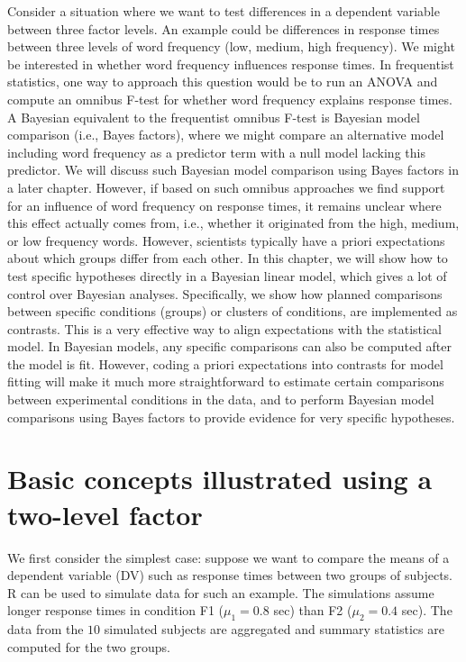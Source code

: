 \documentclass[12pt,]{krantz}
\theoremstyle{definition}
\theoremstyle{definition}
\theoremstyle{definition}
\theoremstyle{remark}
\begin{document}
Consider a situation where we want to test differences in a dependent
variable between three factor levels. An example could be differences in
response times between three levels of word frequency (low, medium, high
frequency). We might be interested in whether word frequency influences
response times. In frequentist statistics, one way to approach this
question would be to run an ANOVA and compute an omnibus F-test for
whether word frequency explains response times. A Bayesian equivalent to
the frequentist omnibus F-test is Bayesian model comparison (i.e., Bayes
factors), where we might compare an alternative model including word
frequency as a predictor term with a null model lacking this predictor.
We will discuss such Bayesian model comparison using Bayes factors in a
later chapter. However, if based on such omnibus approaches we find
support for an influence of word frequency on response times, it remains
unclear where this effect actually comes from, i.e., whether it
originated from the high, medium, or low frequency words. However,
scientists typically have a priori expectations about which groups
differ from each other. In this chapter, we will show how to test
specific hypotheses directly in a Bayesian linear model, which gives a
lot of control over Bayesian analyses. Specifically, we show how planned
comparisons between specific conditions (groups) or clusters of
conditions, are implemented as contrasts. This is a very effective way
to align expectations with the statistical model. In Bayesian models,
any specific comparisons can also be computed after the model is fit.
However, coding a priori expectations into contrasts for model fitting
will make it much more straightforward to estimate certain comparisons
between experimental conditions in the data, and to perform Bayesian
model comparisons using Bayes factors to provide evidence for very
specific hypotheses.

\section{Basic concepts illustrated using a two-level
factor}\label{basic-concepts-illustrated-using-a-two-level-factor}

We first consider the simplest case: suppose we want to compare the
means of a dependent variable (DV) such as response times between two
groups of subjects. R can be used to simulate data for such an example.
The simulations assume longer response times in condition F1
(\(\mu_1 = 0.8\) sec) than F2 (\(\mu_2 = 0.4\) sec). The data from the
\(10\) simulated subjects are aggregated and summary statistics are
computed for the two groups.
\end{document}
